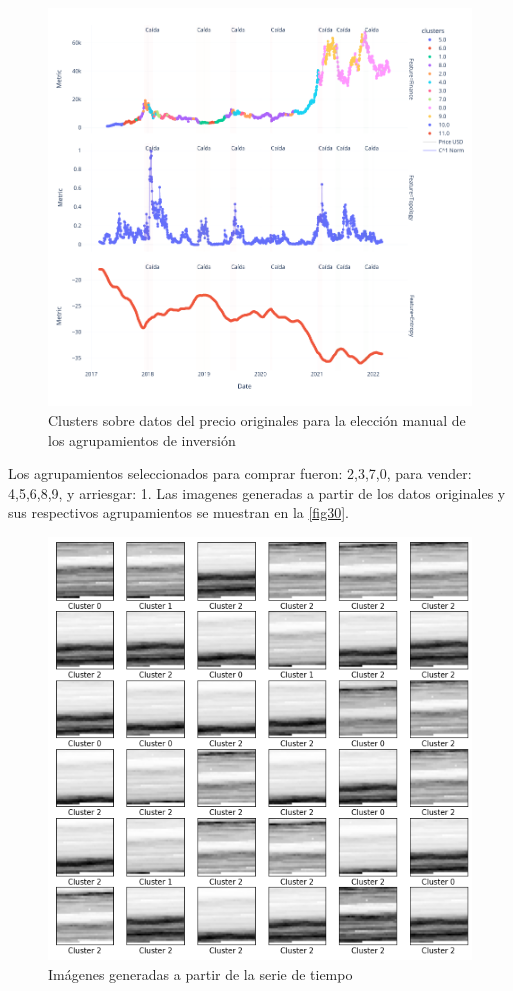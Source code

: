 \begin{figure}[h!]
	\centering
	\includegraphics[scale=0.5]{Chapter5/clasifica_inv2.png}
	\caption{Clusters sobre datos del precio originales para la elección manual de los agrupamientos de inversión}
	\label{fig29}
\end{figure}

Los agrupamientos seleccionados para comprar fueron: 2,3,7,0, para vender: 4,5,6,8,9, y arriesgar: 1.
Las imagenes generadas a partir de los datos originales y sus respectivos agrupamientos se muestran en la \autoref{fig30}. 

\begin{figure}[h!]
	\centering
	\includegraphics[scale=0.5]{Chapter5/IMG_cluster.png}
	\caption{Imágenes generadas a partir de la serie de tiempo}
	\label{fig30}
\end{figure}

